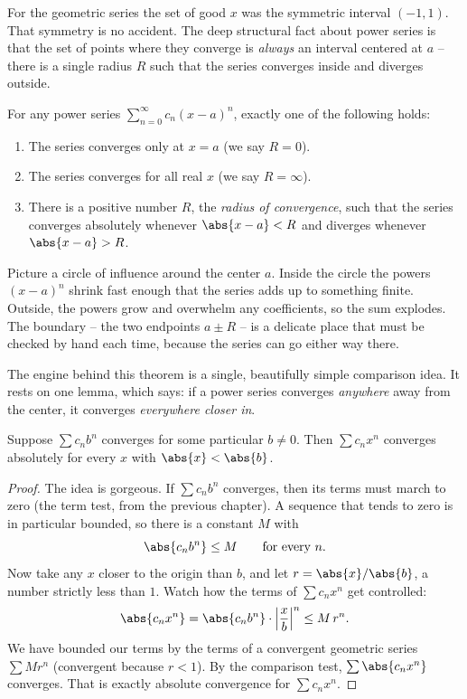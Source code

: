 For the geometric series the set of good $x$ was the symmetric interval $(-1,1)$. That symmetry is no accident. The deep structural fact about power series is that the set of points where they converge is \emph{always} an interval centered at $a$ -- there is a single radius $R$ such that the series converges inside and diverges outside.

\begin{theorem}
\label{ch30:thm-radius}
For any power series $\sum_{n=0}^{\infty} c_n (x-a)^n$, exactly one of the following holds:
\begin{enumerate}
  \item The series converges only at $x = a$ (we say $R = 0$).
  \item The series converges for all real $x$ (we say $R = \infty$).
  \item There is a positive number $R$, the \emph{radius of convergence}, such that the series converges absolutely whenever $\abs{x-a} < R$ and diverges whenever $\abs{x-a} > R$.
\end{enumerate}
\end{theorem}

\begin{intuitionbox}
Picture a circle of influence around the center $a$. Inside the circle the powers $(x-a)^n$ shrink fast enough that the series adds up to something finite. Outside, the powers grow and overwhelm any coefficients, so the sum explodes. The boundary -- the two endpoints $a \pm R$ -- is a delicate place that must be checked by hand each time, because the series can go either way there.
\end{intuitionbox}

The engine behind this theorem is a single, beautifully simple comparison idea. It rests on one lemma, which says: if a power series converges \emph{anywhere} away from the center, it converges \emph{everywhere closer in}.

\begin{lemma}
\label{ch30:lem-abel}
Suppose $\sum c_n b^n$ converges for some particular $b \neq 0$. Then $\sum c_n x^n$ converges absolutely for every $x$ with $\abs{x} < \abs{b}$.
\end{lemma}

\begin{proof}
The idea is gorgeous. If $\sum c_n b^n$ converges, then its terms must march to zero (the term test, from the previous chapter). A sequence that tends to zero is in particular bounded, so there is a constant $M$ with
\[
  \abs{c_n b^n} \le M \qquad \text{for every } n.
\]
Now take any $x$ closer to the origin than $b$, and let $r = \abs{x}/\abs{b}$, a number strictly less than $1$. Watch how the terms of $\sum c_n x^n$ get controlled:
\[
  \abs{c_n x^n}
  = \abs{c_n b^n}\cdot \left|\frac{x}{b}\right|^n
  \le M \, r^n.
\]
We have bounded our terms by the terms of a convergent geometric series $\sum M r^n$ (convergent because $r<1$). By the comparison test, $\sum \abs{c_n x^n}$ converges. That is exactly absolute convergence for $\sum c_n x^n$.
\end{proof}


